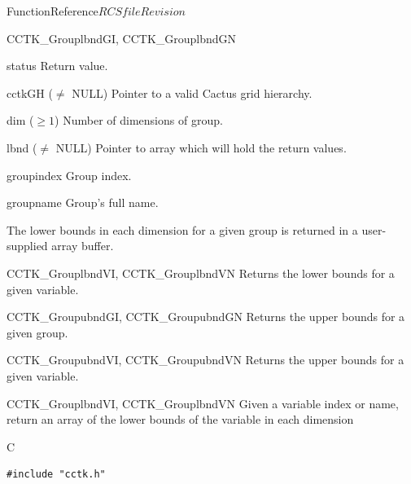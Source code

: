 \begin{cactuspart}{FunctionReference}{$RCSfile$}{$Revision$}
\begin{FunctionDescription}{CCTK\_GrouplbndGI, CCTK\_GrouplbndGN}
\begin{ParameterSection}
\begin{Parameter}{status} Return value. \end{Parameter}
\begin{Parameter}{cctkGH ($\ne$ NULL)} Pointer to a valid Cactus grid hierarchy. \end{Parameter}
\begin{Parameter}{dim ($\ge 1$)} Number of dimensions of group. \end{Parameter}
\begin{Parameter}{lbnd ($\ne$ NULL)} Pointer to array which will hold the return values. \end{Parameter}
\begin{Parameter}{groupindex} Group index. \end{Parameter}
\begin{Parameter}{groupname} Group's full name. \end{Parameter}
\end{ParameterSection}

\begin{Discussion}
The lower bounds in each dimension for a given group is returned in a user-supplied array buffer.
\end{Discussion}

\begin{SeeAlsoSection}
\begin{SeeAlso}{CCTK\_GrouplbndVI, CCTK\_GrouplbndVN}
Returns the lower bounds for a given variable.
\end{SeeAlso}
\begin{SeeAlso}{CCTK\_GroupubndGI, CCTK\_GroupubndGN}
Returns the upper bounds for a given group.
\end{SeeAlso}
\begin{SeeAlso}{CCTK\_GroupubndVI, CCTK\_GroupubndVN}
Returns the upper bounds for a given variable.
\end{SeeAlso}
\end{SeeAlsoSection}

\end{FunctionDescription}


\begin{FunctionDescription}{CCTK\_GrouplbndVI, CCTK\_GrouplbndVN}
\label{CCTK-GrouplbndVI}
\label{CCTK-GrouplbndVN}
Given a variable index or name, return an array of the lower bounds of the variable in each dimension

\begin{SynopsisSection}
\begin{Synopsis}{C}
\begin{verbatim}
#include "cctk.h"


\end{verbatim}
\end{Synopsis}
\end{SynopsisSection}
\end{FunctionDescription}
\end{cactuspart}
